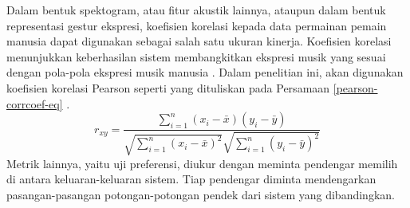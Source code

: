 Dalam bentuk spektogram, atau fitur akustik lainnya, ataupun dalam bentuk representasi gestur ekspresi, koefisien korelasi kepada data permainan pemain manusia dapat digunakan sebagai salah satu ukuran kinerja. Koefisien korelasi menunjukkan keberhasilan sistem membangkitkan ekspresi musik yang sesuai dengan pola-pola ekspresi musik manusia \parencite{schubert2017test} \parencite{lindemann2007rpm}
\parencite{yu2017bowing}. Dalam penelitian ini, akan digunakan koefisien korelasi Pearson seperti yang dituliskan pada Persamaan \ref{pearson-corrcoef-eq} \parencite{pearson1895note}.
\begin{equation}
    r_{xy}=\dfrac{\sum^n_{i=1}(x_i-\bar{x})(y_i-\bar{y})}{\sqrt{\sum^n_{i=1}(x_i-\bar{x})^2}{\sqrt{\sum^n_{i=1}(y_i-\bar{y})^2}}}
\end{equation}\label{pearson-corrcoef-eq}
Metrik lainnya, yaitu uji preferensi, diukur dengan meminta pendengar memilih di antara keluaran-keluaran sistem. Tiap pendengar diminta mendengarkan pasangan-pasangan potongan-potongan pendek dari sistem yang dibandingkan. \parencite{bonada2017singing}